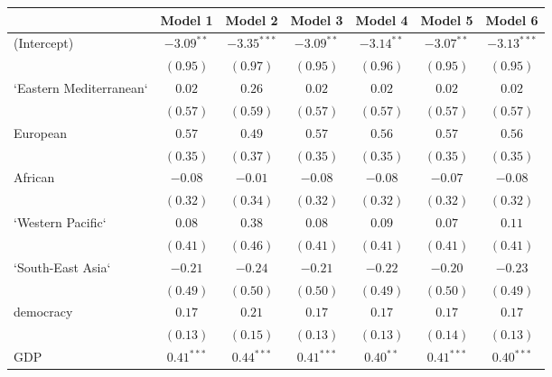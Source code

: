 
\begin{table}[!h]
\begin{center}
\begin{tabular}{l c c c c c c }
\toprule
 & Model 1 & Model 2 & Model 3 & Model 4 & Model 5 & Model 6 \\
\midrule
(Intercept)             & $-3.09^{**}$ & $-3.35^{***}$ & $-3.09^{**}$ & $-3.14^{**}$ & $-3.07^{**}$ & $-3.13^{***}$ \\
                        & $(0.95)$     & $(0.97)$      & $(0.95)$     & $(0.96)$     & $(0.95)$     & $(0.95)$      \\
`Eastern Mediterranean` & $0.02$       & $0.26$        & $0.02$       & $0.02$       & $0.02$       & $0.02$        \\
                        & $(0.57)$     & $(0.59)$      & $(0.57)$     & $(0.57)$     & $(0.57)$     & $(0.57)$      \\
European                & $0.57$       & $0.49$        & $0.57$       & $0.56$       & $0.57$       & $0.56$        \\
                        & $(0.35)$     & $(0.37)$      & $(0.35)$     & $(0.35)$     & $(0.35)$     & $(0.35)$      \\
African                 & $-0.08$      & $-0.01$       & $-0.08$      & $-0.08$      & $-0.07$      & $-0.08$       \\
                        & $(0.32)$     & $(0.34)$      & $(0.32)$     & $(0.32)$     & $(0.32)$     & $(0.32)$      \\
`Western Pacific`       & $0.08$       & $0.38$        & $0.08$       & $0.09$       & $0.07$       & $0.11$        \\
                        & $(0.41)$     & $(0.46)$      & $(0.41)$     & $(0.41)$     & $(0.41)$     & $(0.41)$      \\
`South-East Asia`       & $-0.21$      & $-0.24$       & $-0.21$      & $-0.22$      & $-0.20$      & $-0.23$       \\
                        & $(0.49)$     & $(0.50)$      & $(0.50)$     & $(0.49)$     & $(0.50)$     & $(0.49)$      \\
democracy               & $0.17$       & $0.21$        & $0.17$       & $0.17$       & $0.17$       & $0.17$        \\
                        & $(0.13)$     & $(0.15)$      & $(0.13)$     & $(0.13)$     & $(0.14)$     & $(0.13)$      \\
GDP                     & $0.41^{***}$ & $0.44^{***}$  & $0.41^{***}$ & $0.40^{**}$  & $0.41^{***}$ & $0.40^{***}$  \\

\end{tabular}
\end{center}
\end{table}
